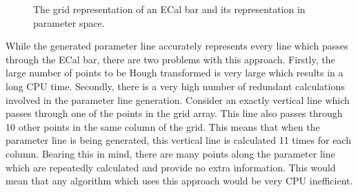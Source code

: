 \begin{figure}%
  \centering
  \caption{The grid representation of an ECal bar and its representation in parameter space.}
  \label{fig:ECalBarGridRepresentationAndHoughTransform}
\end{figure}
\newline
\newline
While the generated parameter line accurately represents every line which passes through the ECal bar, there are two problems with this approach.  Firstly, the large number of points to be Hough transformed is very large which results in a long CPU time.  Secondly, there is a very high number of redundant calculations involved in the parameter line generation.  Consider an exactly vertical line which passes through one of the points in the grid array.  This line also passes through 10 other points in the same column of the grid.  This means that when the parameter line is being generated, this vertical line is calculated 11 times for each column.  Bearing this in mind, there are many points along the parameter line which are repeatedly calculated and provide no extra information.  This would mean that any algorithm which uses this approach would be very CPU inefficient.
\newline
\newline
